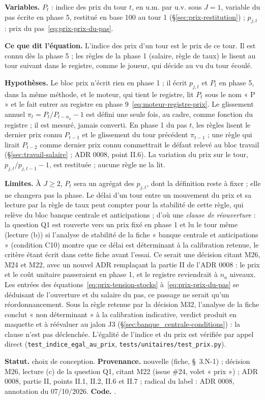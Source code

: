 \documentclass[11pt,a4paper]{article}
\newcommand{\variables}{\par\noindent\textbf{Variables.} }
\newcommand{\sens}{\par\noindent\textbf{Ce que dit l'équation.} }
\newcommand{\hyp}{\par\noindent\textbf{Hypothèses.} }
\newcommand{\limites}{\par\noindent\textbf{Limites.} }
\newcommand{\code}[1]{\texttt{\detokenize{#1}}}
\newcommand{\tracabilite}[3]{\par\smallskip\noindent\textbf{Statut.} #1. \textbf{Provenance.} #2. \textbf{Code.} \code{#3}.}
\begin{document}
\begin{lecture}
\variables $P_t$ : indice des prix du tour $t$, en u.m. par u.v. sous $J = 1$, variable du pas écrite en phase 5, restitué en base 100 au tour 1 (\S\ref{sec:prix-restitution}) ; $p_{j,t}$ : prix du pas~\eqref{eq:prix-prix-du-pas}.
\sens L'indice des prix d'un tour est le prix de ce tour. Il est connu dès la phase 5 ; les règles de la phase 1 (salaire, règle de taux) le lisent au tour suivant dans le registre, comme le joueur, qui décide au vu du tour écoulé.
\hyp Le bloc prix n'écrit rien en phase 1 ; il écrit $p_{j,t}$ et $P_t$ en phase 5, dans la même méthode, et le moteur, qui tient le registre, lit $P_t$ sous le nom « P » et le fait entrer au registre en phase 9~\eqref{eq:moteur-registre-prix}. Le glissement annuel $\pi_t = P_t/P_{t-n_a} - 1$ est défini une seule fois, au cadre, comme fonction du registre ; il est mesuré, jamais converti. En phase 1 du pas $t$, les règles lisent le dernier prix connu $P_{t-1}$ et le glissement du tour précédent $\pi_{t-1}$ ; une règle qui lirait $P_{t-2}$ comme dernier prix connu commettrait le défaut relevé au bloc travail (\S\ref{sec:travail-salaire} ; ADR 0008, point II.6). La variation du prix sur le tour, $p_{j,t}/p_{j,t-1} - 1$, est restituée ; aucune règle ne la lit.
\limites À $J \ge 2$, $P_t$ sera un agrégat des $p_{j,t}$, dont la définition reste à fixer ; elle ne changera pas la phase. Le délai d'un tour entre un mouvement du prix et sa lecture par la règle de taux peut compter pour la stabilité de cette règle, qui relève du bloc banque centrale et anticipations ; d'où une \emph{clause de réouverture} : la question Q1 est rouverte vers un prix fixé en phase 1 et lu le tour même (lecture (b)) si l'analyse de stabilité de la fiche « banque centrale et anticipations » (condition C10) montre que ce délai est déterminant à la calibration retenue, le critère étant écrit dans cette fiche avant l'essai. Ce serait une décision citant M26, M24 et M22, avec un nouvel ADR remplaçant la partie II de l'ADR 0008 : le prix et le coût unitaire passeraient en phase 1, et le registre reviendrait à $n_a$ niveaux. Les entrées des équations~\eqref{eq:prix-tension-stocks} à~\eqref{eq:prix-prix-du-pas} se déduisant de l'ouverture et du salaire du pas, ce passage ne serait qu'un réordonnancement. Sous la règle retenue par la décision M32, l'analyse de la fiche conclut « non déterminant » à la calibration indicative, verdict produit en maquette et à réévaluer au jalon J3 (\S\ref{sec:banque_centrale-conditions}) : la clause n'est pas déclenchée. L'égalité de l'indice et du prix est vérifiée par appel direct (\nolinkurl{test_indice_egal_au_prix}, \nolinkurl{tests/unitaires/test_prix.py}).
\tracabilite{choix de conception}{nouvelle (fiche, \S~3.N-1) ; décision M26, lecture (c) de la question Q1, citant M22 (issue \#24, volet « prix ») ; ADR 0008, partie II, points II.1, II.2, II.6 et II.7 ; radical du label : ADR 0008, annotation du 07/10/2026}{nations.blocs.prix.indice_des_prix}
\end{lecture}
\end{document}
